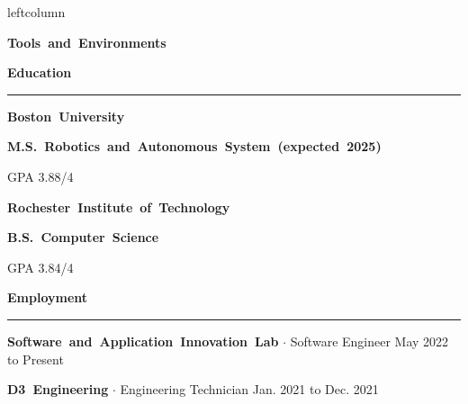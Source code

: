 \documentclass{article}
\newcommand{\rSection}[1] {
  \textcolor{header-blue} {
    \textbf{{\fontsize{0.5cm}{0.45cm}\selectfont \hbox{#1}}} \\
    \rule{0.30\textwidth}{0.1cm}
  }
}
\newcommand{\rSubSection}[1] {
  \textbf{{\fontsize{0.4cm}{0.45cm}\selectfont \hbox{#1}}}
}
\newcommand{\rSubSubSection}[1] {
  \textbf{{\fontsize{0.35cm}{0.45cm}\selectfont \hbox{#1}}}
}
\newcommand\level[2]{%
  \tikz{%
    \ifx#20
    \else
      \foreach \i in {1,...,#2} {
        \filldraw[black!20] (\i ex,0) circle (0.4ex);
      };
    \fi
    \ifx#10
    \else
      \foreach \i in {1,...,#1} {
        \filldraw[black] (\i ex,0) circle (0.4ex);
      };
    \fi
  }
}
\begin{document}
\begin{dynamiccontents*}{leftcolumn}
    \rSubSection{Tools and Environments} \par \bigskip
    \vspace{-10pt}

\end{dynamiccontents*}

\rSection{Education} \par
\rSubSubSection{Boston University} \par
\rSubSubSection{M.S. Robotics and Autonomous System (expected 2025)} \par
GPA 3.88/4 \par

\rSubSubSection{Rochester Institute of Technology} \par
\rSubSubSection{B.S. Computer Science} \par
GPA 3.84/4 \par

\rSection{Employment} \par

\rSubSubSection{Software and Application Innovation Lab} $ \cdot $ Software Engineer \hfill May 2022 to Present \par
\vspace{-10pt}
    
\vspace{-10pt}

\rSubSubSection{D3 Engineering} $ \cdot $ Engineering Technician \hfill Jan. 2021 to Dec. 2021 \par
\vspace{-10pt}
    
\vspace{-10pt}
\end{document}
